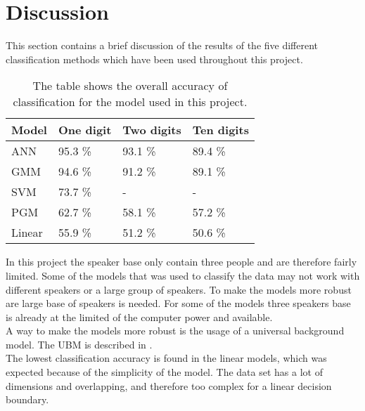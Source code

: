 \section*{Discussion}
This section contains a brief discussion of the results of the five different classification methods which have been used throughout this project. 

\begin{table}[h]
\begin{tabular}{@{}l|lll@{}}
\toprule
Model 		   		   & One digit            & Two digits  & Ten digits   \\ \midrule
ANN                    & 95.3 \%                & 93.1 \%   & 89.4 \% \\
GMM                    & 94.6 \%                & 91.2 \%   & 89.1 \% \\
SVM                    & 73.7 \%                & - 	    & -       \\ 
PGM                    & 62.7 \% 				& 58.1 \%   & 57.2 \% \\
Linear                 & 55.9 \% 				& 51.2 \%   & 50.6 \%

\end{tabular}
\caption{The table shows the overall accuracy of classification for the model used in this project. }
\label{table:result}
\end{table}

In this project the speaker base only contain three people and are therefore fairly limited. 
Some of the models that was used to classify the data may not work with different speakers or a large group of speakers.
To make the models more robust are large base of speakers is needed.
For some of the models three speakers base is already at the limited of the computer power and  available.\\

A way to make the models more robust is the usage of a universal background model.
The UBM is described in \cite{Springer:36}.\\

The lowest classification accuracy is found in the linear models, which was expected because of the simplicity of the model.
The data set has a lot of dimensions and overlapping, and therefore too complex for a linear decision boundary.

  

